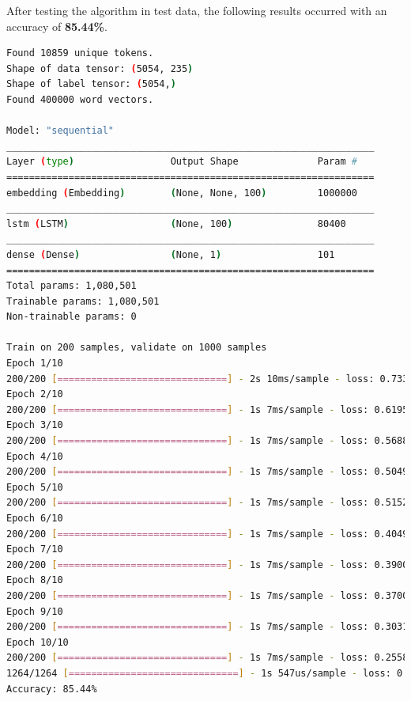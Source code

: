 After testing the algorithm in test data, the following results occurred with an accuracy of \textbf{85.44\%}.

\begin{lstlisting}[language=bash]
Found 10859 unique tokens.
Shape of data tensor: (5054, 235)
Shape of label tensor: (5054,)
Found 400000 word vectors.
​
Model: "sequential"
_________________________________________________________________
Layer (type)                 Output Shape              Param #   
=================================================================
embedding (Embedding)        (None, None, 100)         1000000   
_________________________________________________________________
lstm (LSTM)                  (None, 100)               80400     
_________________________________________________________________
dense (Dense)                (None, 1)                 101       
=================================================================
Total params: 1,080,501
Trainable params: 1,080,501
Non-trainable params: 0
​
Train on 200 samples, validate on 1000 samples
Epoch 1/10
200/200 [==============================] - 2s 10ms/sample - loss: 0.7334 - acc: 0.5800 - val_loss: 0.6299 - val_acc: 0.7430
Epoch 2/10
200/200 [==============================] - 1s 7ms/sample - loss: 0.6195 - acc: 0.7650 - val_loss: 0.5864 - val_acc: 0.7080
Epoch 3/10
200/200 [==============================] - 1s 7ms/sample - loss: 0.5688 - acc: 0.7500 - val_loss: 0.5288 - val_acc: 0.7730
Epoch 4/10
200/200 [==============================] - 1s 7ms/sample - loss: 0.5049 - acc: 0.8000 - val_loss: 0.5366 - val_acc: 0.7360
Epoch 5/10
200/200 [==============================] - 1s 7ms/sample - loss: 0.5152 - acc: 0.7600 - val_loss: 0.4399 - val_acc: 0.8560
Epoch 6/10
200/200 [==============================] - 1s 7ms/sample - loss: 0.4049 - acc: 0.8650 - val_loss: 0.3978 - val_acc: 0.8420
Epoch 7/10
200/200 [==============================] - 1s 7ms/sample - loss: 0.3900 - acc: 0.8400 - val_loss: 0.4191 - val_acc: 0.8170
Epoch 8/10
200/200 [==============================] - 1s 7ms/sample - loss: 0.3700 - acc: 0.8550 - val_loss: 0.3642 - val_acc: 0.8560
Epoch 9/10
200/200 [==============================] - 1s 7ms/sample - loss: 0.3031 - acc: 0.8800 - val_loss: 0.3359 - val_acc: 0.8620
Epoch 10/10
200/200 [==============================] - 1s 7ms/sample - loss: 0.2558 - acc: 0.9250 - val_loss: 0.3433 - val_acc: 0.8620
1264/1264 [==============================] - 1s 547us/sample - loss: 0.3467 - acc: 0.8544
Accuracy: 85.44%
\end{lstlisting}

